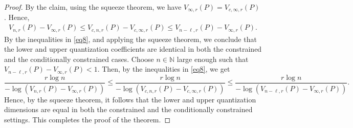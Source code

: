 \documentclass[10pt,a4paper]{amsart}
\begin{document}
\begin{proof}
By the claim, using the squeeze theorem, we have $V_{\infty, r}(P)=V_{c, \infty, r}(P)$. Hence, 
\begin{align}\label{eq8}
	V_{n,r}(P)-V_{\infty, r}(P)\leq V_{c, n,r}(P)-V_{c, \infty, r}(P) \leq V_{n-\ell,r}(P)-V_{\infty, r}(P).
\end{align}
By the inequalities in \eqref{eq8}, and applying the squeeze theorem, we conclude that the lower and upper quantization coefficients are identical in both the constrained and the conditionally constrained cases. 
 Choose $n\in \mathbb{N}$ large enough such that $V_{n-\ell,r}(P)-V_{\infty, r}(P)<1$. Then, by the inequalities in \eqref{eq8}, we get  
 $$\frac{r\log n}{-\log(V_{n,r}(P)-V_{\infty, r}(P))}\leq \frac{r\log n}{-\log(V_{c, n,r}(P)-V_{c, \infty, r}(P))}\leq \frac{r\log n}{-\log(V_{n-\ell,r}(P)-V_{\infty, r}(P))}.$$
Hence, by the squeeze theorem, it follows that the lower and upper quantization dimensions are equal in both the constrained and the conditionally constrained settings. This completes the proof of the theorem.
\end{proof} 
\end{document}
